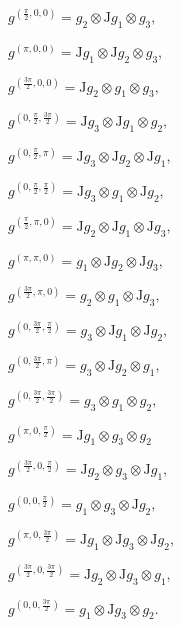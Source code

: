 \documentclass[fleqn,a4paper,oneside,openany]{book}
\begin{document}
$g^{(\frac{\pi}{2},0,0)}= g_{2}\otimes \mathrm{J}g_{1}\otimes g_{3},$

$g^{(\pi,0,0)}= \mathrm{J}g_{1} \otimes \mathrm{J}g_{2}\otimes g_{3},$

$g^{(\frac{3\pi}{2},0,0)}= \mathrm{J}g_{2}\otimes g_{1}\otimes g_{3},$

$g^{(0,\frac{\pi}{2},\frac{3\pi}{2})}= \mathrm{J}g_{3}\otimes \mathrm{J}g_{1}\otimes g_{2},$

$g^{(0,\frac{\pi}{2},\pi)}= \mathrm{J}g_{3}\otimes \mathrm{J}g_{2}\otimes \mathrm{J}g_{1},$

$g^{(0,\frac{\pi}{2},\frac{\pi}{2})}= \mathrm{J}g_{3}\otimes g_{1}\otimes \mathrm{J}g_{2},$

$g^{(\frac{\pi}{2},\pi,0)}= \mathrm{J}g_{2}\otimes \mathrm{J}g_{1}\otimes \mathrm{J}g_{3},$

$g^{(\pi,\pi,0)}= g_{1}\otimes \mathrm{J}g_{2}\otimes \mathrm{J}g_{3},$

$g^{(\frac{3\pi}{2},\pi,0)}= g_{2}\otimes g_{1}\otimes \mathrm{J}g_{3},$

$g^{(0,\frac{3\pi}{2},\frac{\pi}{2})}= g_{3}\otimes \mathrm{J}g_{1}\otimes \mathrm{J}g_{2},$

$g^{(0,\frac{3\pi}{2},\pi)}= g_{3}\otimes \mathrm{J}g_{2}\otimes g_{1},$

$g^{(0,\frac{3\pi}{2},\frac{3\pi}{2})}= g_{3}\otimes g_{1}\otimes g_{2},$

$g^{(\pi,0,\frac{\pi}{2})}= \mathrm{J}g_{1}\otimes g_{3}\otimes g_{2}$

$g^{(\frac{3\pi}{2},0,\frac{\pi}{2})}= \mathrm{J}g_{2}\otimes g_{3}\otimes \mathrm{J}g_{1},$

$g^{(0,0,\frac{\pi}{2})}= g_{1}\otimes g_{3}\otimes \mathrm{J}g_{2},$

$g^{(\pi,0,\frac{3\pi}{2})}= \mathrm{J}g_{1}\otimes \mathrm{J}g_{3}\otimes \mathrm{J}g_{2},$

$g^{(\frac{3\pi}{2},0,\frac{3\pi}{2})}= \mathrm{J}g_{2}\otimes \mathrm{J}g_{3}\otimes g_{1},$

$g^{(0,0,\frac{3\pi}{2})}= g_{1}\otimes \mathrm{J}g_{3}\otimes g_{2}.$
\end{document}
